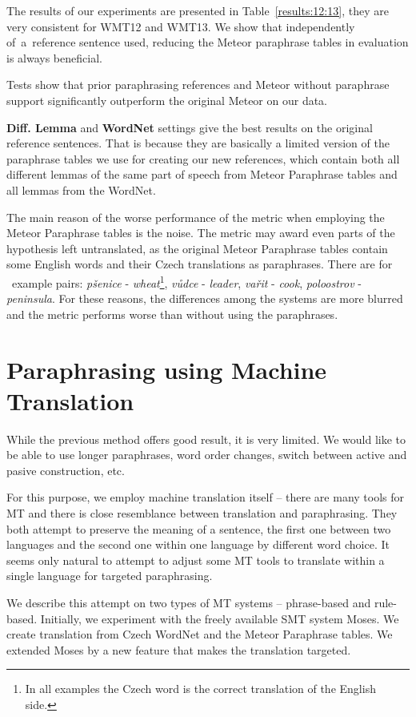 \documentclass[11pt]{article}
\def\Tref#1{Table~\ref{#1}}
\begin{document}
The results of our experiments are presented in \Tref{results:12:13}, they are 
very consistent for WMT12 and WMT13. We show that independently of~a~reference 
sentence used, reducing the Meteor paraphrase tables in evaluation is always 
beneficial.

Tests show that prior paraphrasing references and Meteor without paraphrase
support significantly outperform the original Meteor on our data.

\textbf{Diff. Lemma} and \textbf{WordNet} settings give the best results on the 
original reference sentences. That is because they are basically a limited 
version of the paraphrase tables we use for creating our new references, which 
contain both all different lemmas of the same part of speech from Meteor 
Paraphrase tables and all lemmas from the WordNet.

The main reason of the worse performance of the metric when employing the 
Meteor Paraphrase tables is the noise. The metric may award even parts of the 
hypothesis left untranslated, as the original Meteor Paraphrase tables contain 
some English words and their Czech translations as paraphrases. There are for
~example pairs: \textit{pšenice} - \textit{wheat}\footnote{In all examples the 
Czech word is the correct translation of the English side.}, \textit{vůdce} - 
\textit{leader}, \textit{vařit} -	\textit{cook}, \textit{poloostrov} - 
\textit{peninsula}. For these reasons, the differences among the systems are 
more blurred and the metric performs worse than without using the paraphrases. 

\section{Paraphrasing using Machine Translation}
\label{MT}
While the previous method offers good result, it is very limited. We would like
to be able to use longer paraphrases, word order changes, switch between active 
and pasive construction, etc.

For this purpose, we employ machine translation itself -- there are many tools 
for MT and there is close resemblance between translation and paraphrasing. 
They both attempt to preserve the meaning of a sentence, the first one between 
two languages and the second one within one language by different word choice. 
It seems only natural to attempt to adjust some MT tools to translate within a 
single language for targeted paraphrasing. 

We describe this attempt on two types of MT systems -- phrase-based and 
rule-based. Initially, we experiment with the freely available SMT system 
Moses. \cite{moses} We create translation from Czech WordNet and the Meteor 
Paraphrase tables. We extended Moses by a new feature that makes the 
translation targeted. 
\end{document}
